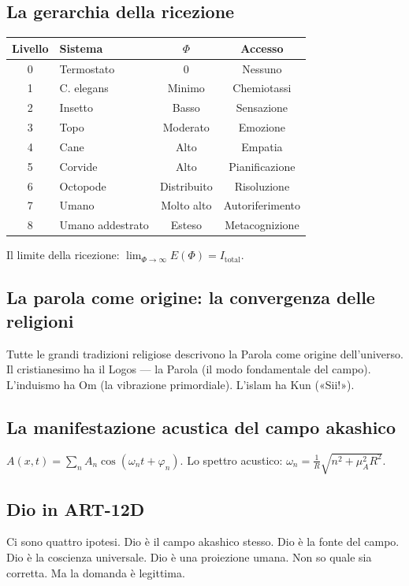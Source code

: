 \subsection{La gerarchia della ricezione}
\begin{table}[H]
\centering
\begin{tabular}{@{}clcc@{}}
\toprule
\textbf{Livello} & \textbf{Sistema} & \textbf{$\Phi$} & \textbf{Accesso} \\ \midrule
0 & Termostato & 0 & Nessuno \\
1 & C. elegans & Minimo & Chemiotassi \\
2 & Insetto & Basso & Sensazione \\
3 & Topo & Moderato & Emozione \\
4 & Cane & Alto & Empatia \\
5 & Corvide & Alto & Pianificazione \\
6 & Octopode & Distribuito & Risoluzione \\
7 & Umano & Molto alto & Autoriferimento \\
8 & Umano addestrato & Esteso & Metacognizione \\ \bottomrule
\end{tabular}
\end{table}
Il limite della ricezione: $\lim_{\Phi \rightarrow \infty} E(\Phi) = I_{\text{total}}$.

\subsection{La parola come origine: la convergenza delle religioni}
Tutte le grandi tradizioni religiose descrivono la Parola come origine dell'universo. Il cristianesimo ha il Logos --- la Parola (il modo fondamentale del campo). L'induismo ha Om (la vibrazione primordiale). L'islam ha Kun («Sii!»).

\subsection{La manifestazione acustica del campo akashico}
$A(x,t) = \sum_n A_n \cos(\omega_n t + \varphi_n)$. Lo spettro acustico: $\omega_n = \frac{1}{R} \sqrt{n^2 + \mu_A^2 R^2}$.

\subsection{Dio in ART-12D}
Ci sono quattro ipotesi. Dio è il campo akashico stesso. Dio è la fonte del campo. Dio è la coscienza universale. Dio è una proiezione umana. Non so quale sia corretta. Ma la domanda è legittima.

